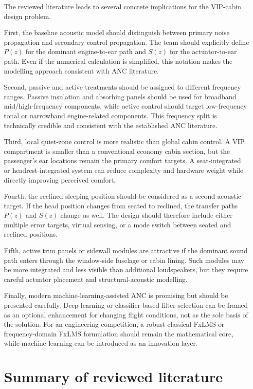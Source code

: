 The reviewed literature leads to several concrete implications for the VIP-cabin design problem.

First, the baseline acoustic model should distinguish between primary noise propagation and secondary control propagation. The team should explicitly define $P(z)$ for the dominant engine-to-ear path and $S(z)$ for the actuator-to-ear path. Even if the numerical calculation is simplified, this notation makes the modelling approach consistent with ANC literature.

Second, passive and active treatments should be assigned to different frequency ranges. Passive insulation and absorbing panels should be used for broadband mid/high-frequency components, while active control should target low-frequency tonal or narrowband engine-related components. This frequency split is technically credible and consistent with the established ANC literature.

Third, local quiet-zone control is more realistic than global cabin control. A VIP compartment is smaller than a conventional economy cabin section, but the passenger's ear locations remain the primary comfort targets. A seat-integrated or headrest-integrated system can reduce complexity and hardware weight while directly improving perceived comfort.

Fourth, the reclined sleeping position should be considered as a second acoustic target. If the head position changes from seated to reclined, the transfer paths $P(z)$ and $S(z)$ change as well. The design should therefore include either multiple error targets, virtual sensing, or a mode switch between seated and reclined positions.

Fifth, active trim panels or sidewall modules are attractive if the dominant sound path enters through the window-side fuselage or cabin lining. Such modules may be more integrated and less visible than additional loudspeakers, but they require careful actuator placement and structural-acoustic modelling.

Finally, modern machine-learning-assisted ANC is promising but should be presented carefully. Deep learning or classifier-based filter selection can be framed as an optional enhancement for changing flight conditions, not as the sole basis of the solution. For an engineering competition, a robust classical FxLMS or frequency-domain FxLMS formulation should remain the mathematical core, while machine learning can be introduced as an innovation layer.

\section{Summary of reviewed literature}
\label{sec:literature-summary}

